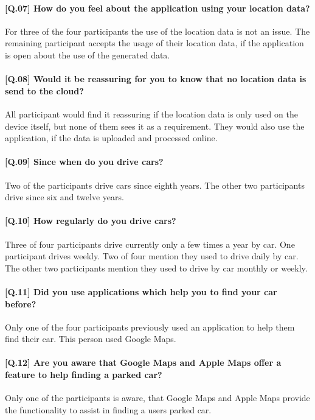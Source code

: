 \paragraph{[Q.07] How do you feel about the application using your location data?}
For three of the four participants the use of the location data is not an issue. The remaining participant accepts the usage of their location data, if the application is open about the use of the generated data. 

\paragraph{[Q.08] Would it be reassuring for you to know that no location data is send to the cloud? }
All participant would find it reassuring if the location data is only used on the device itself, but none of them sees it as a requirement. They would also use the application, if the data is uploaded and processed online. 

\paragraph{[Q.09] Since when do you drive cars?}
Two of the participants drive cars since eighth years. The other two participants drive since six and twelve years.

\paragraph{[Q.10] How regularly do you drive cars?}
Three of four participants drive currently only a few times a year by car. One participant drives weekly. Two of four mention they used to drive daily by car. The other two participants mention they used to drive by car monthly or weekly. 

\paragraph{[Q.11] Did you use applications which help you to find your car before?}
Only one of the four participants previously used an application to help them find their car. This person used Google Maps.

\paragraph{[Q.12] Are you aware that Google Maps and Apple Maps offer a feature to help finding a parked car?}
Only one of the participants is aware, that Google Maps and Apple Maps provide the functionality to assist in finding a users parked car. 

